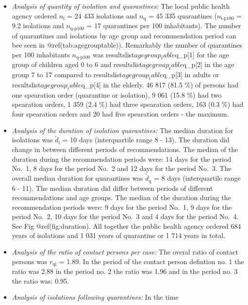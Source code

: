 \documentclass[
]{article}
\begin{document}
\begin{itemize}
\item
  \emph{Analysis of quantity of isolation and quarantines:} The local
  public health agency ordered \(n_{\text{i}}\) = 24 433 isolations and
  \(n_{\text{q}}\) = 45 335 quarantines (\(n_{\text{i-p100}}\) = 9.2
  isolations and \(n_{\text{q-p100}}\) = 17 quarantines per 100
  inhabitants). The number of quarantines and isolations by age group
  and recommendation period can bee seen in @ref(tab:agegrouptable)).
  Remarkably the number of quarantines per 100 inhabitants
  \(n_{\text{q-p100}}\) was resultslist\(agegroup_table\)q\_p{[}1{]} for
  the age group of children aged 0 to 6 and
  resultslist\(agegroup_table\)q\_p{[}2{]} in the age group 7 to 17
  compared to resultslist\(agegroup_table\)q\_p{[}3{]} in adults or
  resultslist\(agegroup_table\)q\_p{[}4{]} in the elderly. 46 817 (81.5
  \%) of persons had one spearation order (quarantine or isolation), 9
  061 (15.8 \%) had two spearation orders, 1 359 (2.4 \%) had three
  spearation orders, 163 (0.3 \%) had four spearation orders and 20 had
  five spearation orders - the maximum.
\item
  \emph{Analysis of the duration of isolation quarantines:} The median
  duration for isolations was \(\tilde d_{\text{i}}\) = 10 days
  (interquartile range 8 - 13). The duration did change in between
  different periods of recommendations. The median of the duration
  during the recommendation periods were: 14 days for the period No.~1,
  8 days for the period No.~2 and 12 days for the period No.~3. The
  overall median duration for quarantines was \(\tilde d_{\text{q}}\) =
  8 days (interquartile range 6 - 11). The median duration did differ
  between periods of different recommendations and age groups. The
  median of the duration during the recommendation periods were: 9 days
  for the period No.~1, 9 days for the period No.~2, 10 days for the
  period No.~3 and 4 days for the period No.~4. See Fig
  @ref(fig:duration). All together the public health agency ordered 684
  years of isolations and 1 031 years of quarantine or 1 714 years in
  total.
\item
  \emph{Analysis of the ratio of contact persons per case:} The overal
  ratio of contact persons was \(r_{\text{qi}}\) = 1.89. In the period
  of the contact person defintion no. 1 the ratio was 2.88 in the period
  no. 2 the ratio was 1.96 and in the period no. 3 the ratio was: 0.95.
\item
  \emph{Analysis of isolations following quarantines:} In the time

\end{itemize}
\end{document}

